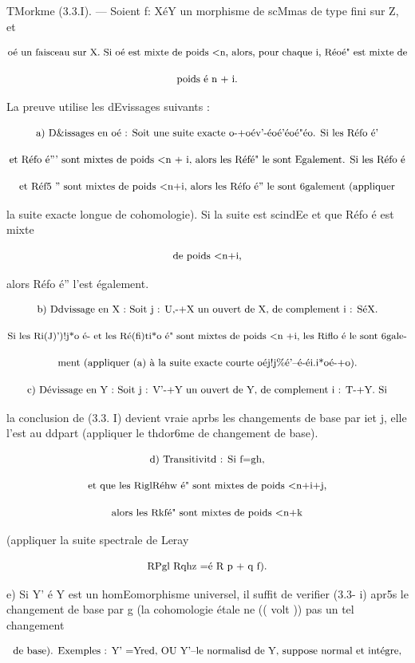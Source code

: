 \documentclass[11pt]{article}
\theoremstyle{remark}
\begin{document}
TMorkme (3.3.I). --- Soient f: XéY un morphisme de scMmas de type fini sur Z, et

\[\text{\small oé un faisceau sur X. Si oé est mixte de poids <n, alors, pour chaque i, Réoé" est mixte de}\]

\[\text{\small poids é n + i.}\]

La preuve utilise les dEvissages suivants :

\[\text{\small a) D\&issages en oé : Soit une suite exacte o-+oév'-éoé'éoé"éo. Si les Réfo é'}\]

\[\text{\small et Réfo é''' sont mixtes de poids <n + i, alors les Réfé" le sont Egalement. Si les Réfo é}\]

\[\text{\small et Réf5 '' sont mixtes de poids <n+i, alors les Réfo é'' le sont 6galement (appliquer}\]

la suite exacte longue de cohomologie). Si la suite est scindEe et que Réfo é est mixte

\[\text{\small de poids <n+i,}\]

alors Réfo é'' l'est également.

\[\text{\small b) Ddvissage en X : Soit j : U,-+X un ouvert de X, de complement i : SéX.}\]

\[\text{\small Si les Ri(J)')!j*o é- et les Ré(fi)ti*o é" sont mixtes de poids <n +i, les Riflo é le sont 6gale-}\]

\[\text{\small ment (appliquer (a) à la suite exacte courte oéj!j\%é'--é-éi.i*oé-+o).}\]

\[\text{\small c) Dévissage en Y : Soit j : V'-+Y un ouvert de Y, de complement i : T-+Y. Si}\]

la conclusion de (3.3. I) devient vraie aprbs les changements de base par iet j, elle l'est au ddpart (appliquer le thdor6me de changement de base).

\[\text{\small d) Transitivitd : Si f=gh,}\]

\[\text{\small et que les RiglRéhw é" sont mixtes de poids <n+i+j,}\]

\[\text{\small alors les Rkfé" sont mixtes de poids <n+k}\]

(appliquer la suite spectrale de Leray

\[\text{\small RPgl Rqhz =é R p + q f).}\]

e) Si Y' é Y est un homEomorphisme universel, il suffit de verifier (3.3- i) apr5s le changement de base par g (la cohomologie étale ne (( volt )) pas un tel changement

\[\text{\small de base). Exemples : Y' =Yred, OU Y'--le normalisd de Y, suppose normal et intégre,}\]
\end{document}

